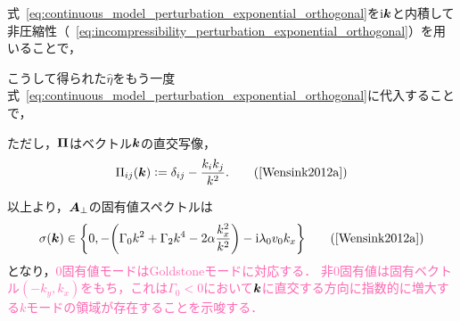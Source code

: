 \documentclass[12pt,dvipdfmx,svgnames,a4paper,uplatex]{ujarticle}
\theoremstyle{plain}
\begin{document}
式~\ref{eq:continuous_model_perturbation_exponential_orthogonal}を\(\mathrm{i}\vb*{k}\)と内積して非圧縮性（~\ref{eq:incompressibility_perturbation_exponential_orthogonal}）を用いることで，
こうして得られた\(\hat{\eta}\)をもう一度式~\ref{eq:continuous_model_perturbation_exponential_orthogonal}に代入することで，
ただし，\(\vb*{\Pi}\)はベクトル\(\vb*{k}\)の直交写像，
\begin{equation}
  \Pi_{ij}(\vb*{k}) \vcentcolon= \delta_{ij} - \frac{k_i k_j}{k^2}.
  \label{eq:Pi}
  \tag{\cite[Eq. 40]{Wensink2012a}}
\end{equation}

以上より，\(\vb*{A}_\bot\)の固有値スペクトルは
\begin{equation}
  \sigma(\vb*{k}) \in \qty{ 0, -\qty( \Gamma_0 k^2 + \Gamma_2 k^4 -2\alpha \frac{k_x^2}{k^2} ) -\mathrm{i} \lambda_0 v_0 k_x }
  \label{eq:eigenvalue_specrum}
  \tag{\cite[Eq. 42]{Wensink2012a}}
\end{equation}
となり，\textcolor{HotPink}{\(0\)固有値モードはGoldstoneモードに対応する．
非\(0\)固有値は固有ベクトル\((- k_y, k_x)\)をもち，これは\(\Gamma_0 < 0\)において\(\vb*{k}\)に直交する方向に指数的に増大する\(k\)モードの領域が存在することを示唆する．}
\end{document}

